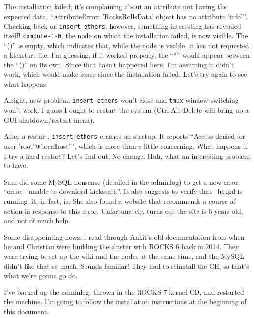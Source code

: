\documentclass[12pt]{article}
\begin{document}
\qq The installation failed; it's complaining about an attribute not having the
expected data, ``AttributeError: 'RocksRollsData' object has no attribute
'info'''. Checking back on {\tt insert-ethers}, however, something interesting
has revealed itself! {\tt compute-1-0}, the node on which the installation
failed, is now visible. The ``()'' is empty, which indicates that, while the
node is visible, it has not requested a kickstart file. I'm guessing, if it
worked properly, the ``*'' would appear between the ``()'' on its own. Since
that hasn't happened here, I'm assuming it didn't work, which would make sense
since the installation failed. Let's try again to see what happens.

\qq Alright, new problem: {\tt insert-ethers} won't close and {\tt tmux} window
switching won't work. I guess I ought to restart the system (Ctrl-Alt-Delete
will bring up a GUI shutdown/restart menu). 

\qq After a restart, {\tt insert-ethers} crashes on startup. It reports ``Access
denied for user 'root'@'localhost''', which is more than a little
concerning. What happens if I try a hard restart? Let's find out. No
change. Huh, what an interesting problem to have.

\qq Sam did some MySQL nonsense (detailed in the adminlog) to get a new error:
``error - unable to download kickstart.''. It also suggests to verify that {\tt
  httpd} is running; it, in fact, is. She also found a website that recommends a
course of action in response to this error. Unfortunately, turns out the site is
6 years old, and not of much help.

\qq Some disappointing news: I read through Ankit's old documentation from when
he and Christian were building the cluster with ROCKS 6 back in 2014. They were
trying to set up the wiki and the nodes at the same time, and the MySQL didn't
like that so much. Sounds familiar! They had to reinstall the CE, so that's what
we're gonna go do.

\qq I've backed up the adminlog, thrown in the ROCKS 7 kernel CD, and restarted
the machine. I'm going to follow the installation instructions at the beginning
of this document.
\end{document}

